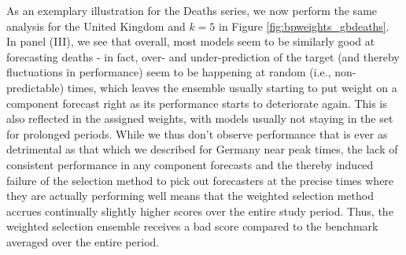 As an exemplary illustration for the Deaths series, we now perform the same analysis for the United Kingdom and $k = 5$ in Figure \ref{fig:bpweights_gbdeaths}. In panel (III), we see that overall, most models seem to be similarly good at forecasting deaths - in fact, over- and under-prediction of the target (and thereby fluctuations in performance) seem to be happening at random (i.e., non-predictable) times, which leaves the ensemble usually starting to put weight on a component forecast right as its performance starts to deteriorate again. This is also reflected in the assigned weights, with models usually not staying in the set for prolonged periods. While we thus don't observe performance that is ever as detrimental as that which we described for Germany near peak times, the lack of consistent performance in any component forecasts and the thereby induced failure of the selection method to pick out forecasters at the precise times where they are actually performing well means that the weighted selection method accrues continually slightly higher scores over the entire study period. Thus, the weighted selection ensemble receives a bad score compared to the benchmark averaged over the entire period.\\
